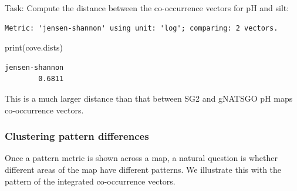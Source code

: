 \documentclass[
  letterpaper,
  DIV=11,
  numbers=noendperiod]{scrartcl}
\newenvironment{Shaded}{\begin{snugshade}}{\end{snugshade}}
\newcommand{\AttributeTok}[1]{\textcolor[rgb]{0.40,0.45,0.13}{#1}}
\newcommand{\ConstantTok}[1]{\textcolor[rgb]{0.56,0.35,0.01}{#1}}
\newcommand{\DecValTok}[1]{\textcolor[rgb]{0.68,0.00,0.00}{#1}}
\newcommand{\FunctionTok}[1]{\textcolor[rgb]{0.28,0.35,0.67}{#1}}
\newcommand{\NormalTok}[1]{\textcolor[rgb]{0.00,0.23,0.31}{#1}}
\newcommand{\OtherTok}[1]{\textcolor[rgb]{0.00,0.23,0.31}{#1}}
\newcommand{\SpecialCharTok}[1]{\textcolor[rgb]{0.37,0.37,0.37}{#1}}
\newcommand{\StringTok}[1]{\textcolor[rgb]{0.13,0.47,0.30}{#1}}
\begin{document}
Task: Compute the distance between the co-occurrence vectors for pH and
silt:

\begin{Shaded}
\end{Shaded}

\begin{verbatim}
Metric: 'jensen-shannon' using unit: 'log'; comparing: 2 vectors.
\end{verbatim}

\begin{Shaded}
\begin{Highlighting}[]
\FunctionTok{print}\NormalTok{(cove.dists)}
\end{Highlighting}
\end{Shaded}

\begin{verbatim}
jensen-shannon 
        0.6811 
\end{verbatim}

This is a much larger distance than that between SG2 and gNATSGO pH maps
co-occurrence vectors.

\hypertarget{clustering-pattern-differences}{%
\subsubsection{Clustering pattern
differences}\label{clustering-pattern-differences}}

Once a pattern metric is shown across a map, a natural question is
whether different areas of the map have different patterns. We
illustrate this with the pattern of the integrated co-occurrence
vectors.
\end{document}
